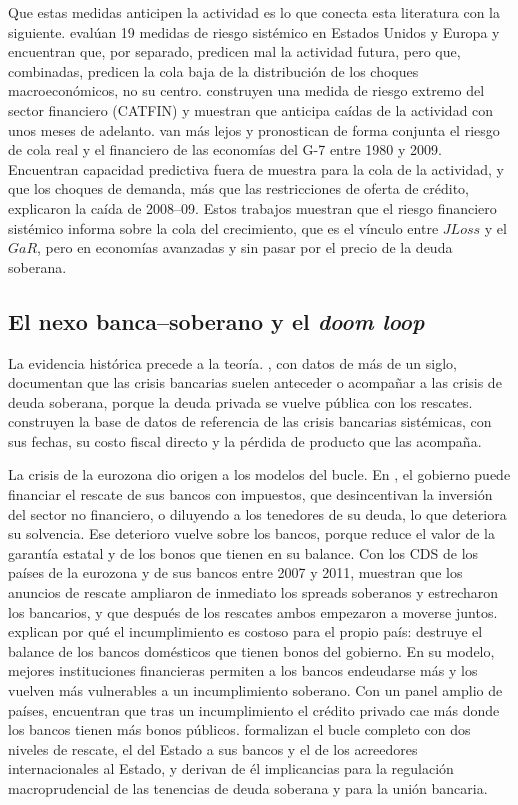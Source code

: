 Que estas medidas anticipen la actividad es lo que conecta esta literatura con la siguiente. \citet{GiglioKellyPruitt2016} evalúan 19 medidas de riesgo sistémico en Estados Unidos y Europa y encuentran que, por separado, predicen mal la actividad futura, pero que, combinadas, predicen la cola baja de la distribución de los choques macroeconómicos, no su centro. \citet{AllenBaliTang2012} construyen una medida de riesgo extremo del sector financiero (CATFIN) y muestran que anticipa caídas de la actividad con unos meses de adelanto. \citet{DeNicoloLucchetta2011} van más lejos y pronostican de forma conjunta el riesgo de cola real y el financiero de las economías del G-7 entre 1980 y 2009. Encuentran capacidad predictiva fuera de muestra para la cola de la actividad, y que los choques de demanda, más que las restricciones de oferta de crédito, explicaron la caída de 2008--09. Estos trabajos muestran que el riesgo financiero sistémico informa sobre la cola del crecimiento, que es el vínculo entre $JLoss$ y el $GaR$, pero en economías avanzadas y sin pasar por el precio de la deuda soberana.

\subsection{El nexo banca--soberano y el \textit{doom loop}}

La evidencia histórica precede a la teoría. \citet{ReinhartRogoff2011}, con datos de más de un siglo, documentan que las crisis bancarias suelen anteceder o acompañar a las crisis de deuda soberana, porque la deuda privada se vuelve pública con los rescates. \citet{LaevenValencia2013,LaevenValencia2020} construyen la base de datos de referencia de las crisis bancarias sistémicas, con sus fechas, su costo fiscal directo y la pérdida de producto que las acompaña.

La crisis de la eurozona dio origen a los modelos del bucle. En \citet{AcharyaDrechslerSchnabl2014b}, el gobierno puede financiar el rescate de sus bancos con impuestos, que desincentivan la inversión del sector no financiero, o diluyendo a los tenedores de su deuda, lo que deteriora su solvencia. Ese deterioro vuelve sobre los bancos, porque reduce el valor de la garantía estatal y de los bonos que tienen en su balance. Con los CDS de los países de la eurozona y de sus bancos entre 2007 y 2011, muestran que los anuncios de rescate ampliaron de inmediato los spreads soberanos y estrecharon los bancarios, y que después de los rescates ambos empezaron a moverse juntos. \citet{GennaioliMartinRossi2014} explican por qué el incumplimiento es costoso para el propio país: destruye el balance de los bancos domésticos que tienen bonos del gobierno. En su modelo, mejores instituciones financieras permiten a los bancos endeudarse más y los vuelven más vulnerables a un incumplimiento soberano. Con un panel amplio de países, encuentran que tras un incumplimiento el crédito privado cae más donde los bancos tienen más bonos públicos. \citet{FarhiTirole2018b} formalizan el bucle completo con dos niveles de rescate, el del Estado a sus bancos y el de los acreedores internacionales al Estado, y derivan de él implicancias para la regulación macroprudencial de las tenencias de deuda soberana y para la unión bancaria.

